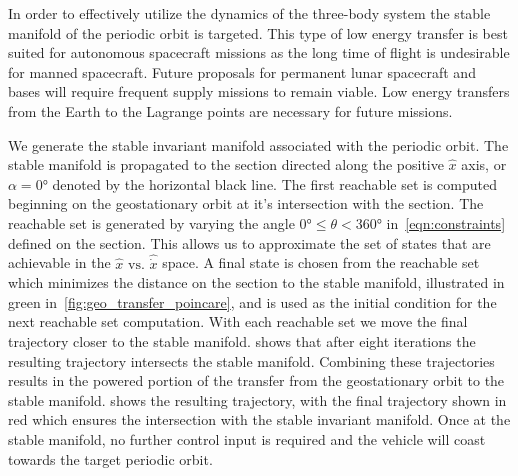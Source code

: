 \documentclass[preprint]{elsarticle}
\begin{document}
In order to effectively utilize the dynamics of the three-body system the stable manifold of the periodic orbit is targeted.
This type of low energy transfer is best suited for autonomous spacecraft missions as the long time of flight is undesirable for manned spacecraft. 
Future proposals for permanent lunar spacecraft and bases will require frequent supply missions to remain viable. 
Low energy transfers from the Earth to the Lagrange points are necessary for future missions.

We generate the stable invariant manifold associated with the periodic orbit.
The stable manifold is propagated to the \Poincare section directed along the positive \( \hat{x} \) axis, or \( \alpha =\ang{0} \) denoted by the horizontal black line.
The first reachable set is computed beginning on the geostationary orbit at it's intersection with the \Poincare section.
The reachable set is generated by varying the angle \( \ang{0} \leq \theta < \ang{360} \) in~\cref{eqn:constraints} defined on the \Poincare section.
This allows us to approximate the set of states that are achievable in the \( \hat{x} \text{ vs. } \hat{\dot{x}} \) space.
A final state is chosen from the reachable set which minimizes the distance on the \Poincare section to the stable manifold, illustrated in green in~\cref{fig:geo_transfer_poincare}, and is used as the initial condition for the next reachable set computation.
With each reachable set we move the final trajectory closer to the stable manifold.
 shows that after eight iterations the resulting trajectory intersects the stable manifold. 
Combining these trajectories results in the powered portion of the transfer from the geostationary orbit to the stable manifold. 
 shows the resulting trajectory, with the final trajectory shown in red which ensures the intersection with the stable invariant manifold.
Once at the stable manifold, no further control input is required and the vehicle will coast towards the target periodic orbit.
\end{document}
